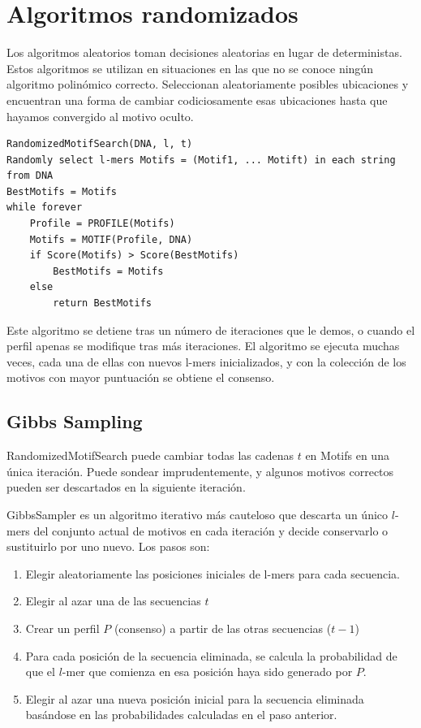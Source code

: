 \section{Algoritmos randomizados}
Los algoritmos aleatorios toman decisiones aleatorias en lugar de deterministas. Estos algoritmos se utilizan en situaciones en las que no se conoce ningún algoritmo polinómico correcto. Seleccionan aleatoriamente posibles ubicaciones y encuentran una forma de cambiar codiciosamente esas ubicaciones hasta que hayamos convergido al motivo oculto.

\begin{lstlisting}
RandomizedMotifSearch(DNA, l, t)
Randomly select l-mers Motifs = (Motif1, ... Motift) in each string from DNA
BestMotifs = Motifs
while forever
	Profile = PROFILE(Motifs)
	Motifs = MOTIF(Profile, DNA)
	if Score(Motifs) > Score(BestMotifs)
		BestMotifs = Motifs
	else
		return BestMotifs
\end{lstlisting}

Este algoritmo se detiene tras un número de iteraciones que le demos, o cuando el perfil apenas se modifique tras más iteraciones. El algoritmo se ejecuta muchas veces, cada una de ellas con nuevos l-mers inicializados, y con la colección de los motivos con mayor puntuación se obtiene el consenso. 

\subsection{Gibbs Sampling}
RandomizedMotifSearch puede cambiar todas las cadenas $t$ en Motifs en una única iteración. Puede sondear imprudentemente, y algunos motivos correctos pueden ser descartados en la siguiente iteración.

GibbsSampler es un algoritmo iterativo más cauteloso que descarta un único $l$-mers del conjunto actual de motivos en cada iteración y decide conservarlo o sustituirlo por uno nuevo. Los pasos son:
\begin{enumerate}
\item Elegir aleatoriamente las posiciones iniciales de l-mers para cada secuencia.
\item Elegir al azar una de las secuencias $t$
\item Crear un perfil $P$ (consenso) a partir de las otras secuencias ($t - 1$)
\item Para cada posición de la secuencia eliminada, se calcula la probabilidad de que el $l$-mer que comienza en esa posición haya sido generado por $P$.
\item Elegir al azar una nueva posición inicial para la secuencia eliminada basándose en las probabilidades calculadas en el paso anterior.
\end{enumerate}

